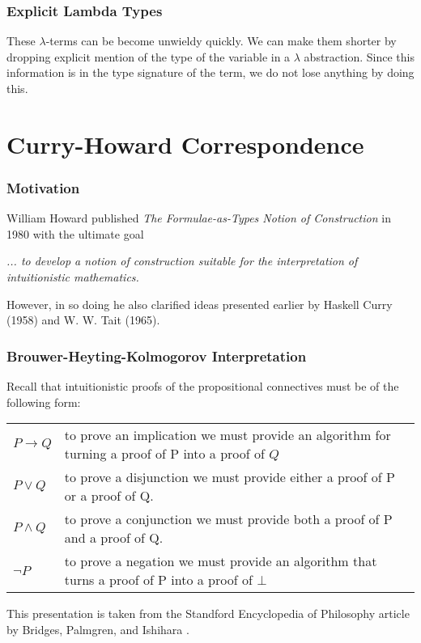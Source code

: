 \documentclass{beamer}
\theoremstyle{indentDefn} \newtheorem{defn}[]{Definition}
\begin{document}
\begin{frame}
  \frametitle{Explicit Lambda Types}

  These $\lambda$-terms can be become unwieldy quickly. We can make them shorter by dropping explicit mention of the type of the variable in a $\lambda$ abstraction. Since this information is in the type signature of the term, we do not lose anything by doing this. 

  \vspace{5cm}

\end{frame}

\section{Curry-Howard Correspondence}

\begin{frame}
  \frametitle{Motivation}

  William Howard \cite{Howard1980} published \emph{The Formulae-as-Types Notion of Construction} in 1980 with the ultimate goal

  \emph{... to develop a notion of construction suitable for the interpretation of intuitionistic mathematics.}

  However, in so doing he also clarified ideas presented earlier by Haskell Curry (1958) and W. W. Tait (1965).

\end{frame}

\begin{frame}
  \frametitle{Brouwer-Heyting-Kolmogorov Interpretation}

  Recall that intuitionistic proofs of the propositional connectives must be of the following form: 

  \vspace{0.5cm}

  \begin{center}
    \begin{tabular}{p{1.5cm}p{8cm}}
      $P \to Q$ & to prove an implication we must provide an algorithm for turning a proof of P into a proof of $Q$\\
      $P \lor Q$ & to prove a disjunction we must provide either a proof of P or a proof of Q. \\
      $P \land Q$ & to prove a conjunction we must provide both a proof of P and a proof of Q. \\
      $\lnot P$ &  to prove a negation we must provide an algorithm that turns a proof of P into a proof of $\bot$ 
    \end{tabular}
  \end{center}

  \vspace{0.5cm}

  This presentation is taken from the Standford Encyclopedia of Philosophy article by Bridges, Palmgren, and Ishihara \cite{sep-mathematics-constructive}.
\end{frame}
\end{document}
